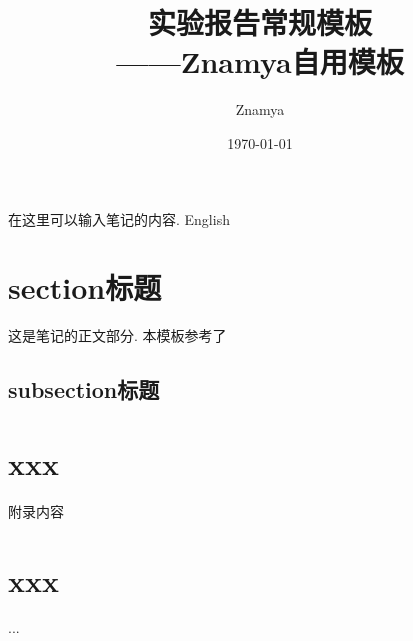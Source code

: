\documentclass[12pt, a4paper, oneside]{ctexart}
\begin{document}
\title{{\Huge{\textbf{实验报告常规模板}}}\\——Znamya自用模板}
\author{Znamya}
\date{\today}

\fancyhead[L]{\rightmark}%


\fancyhead[R]{\thepage}%


\maketitle




{}
\setcounter{page}{1}
\tableofcontents
\newpage
\setcounter{page}{1}


在这里可以输入笔记的内容. English


\section{section标题}

这是笔记的正文部分. 本模板参考了\cite{自用模板}
\subsection{subsection标题}






\begin{appendices}
\section{xxx}
附录内容
\section{xxx}
...
\end{appendices}
\end{document}
